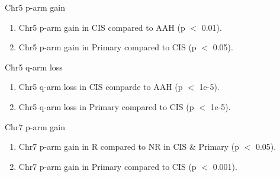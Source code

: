 \documentclass{beamer}
\begin{document}
\begin{frame}[allowframebreaks]
        \begin{block}{Chr5 p-arm gain}
            \begin{enumerate}
                \item Chr5 p-arm gain in CIS compared to AAH (p $<$ 0.01).
                \item Chr5 p-arm gain in Primary compared to CIS (p $<$ 0.05).
            \end{enumerate}

            \begin{table}
                \caption{CGC Tier1 genes in Chr5 p-arm}
                \resizebox{\linewidth}{!}
                {}
            \end{table}
        \end{block}

        \begin{block}{Chr5 q-arm loss}
            \begin{enumerate}
                \item Chr5 q-arm loss in CIS comparde to AAH (p $<$ 1e-5).
                \item Chr5 q-arm loss in Primary compared to CIS (p $<$ 1e-5).
            \end{enumerate}

            \begin{table}
                \caption{CGC Tier1 genes in Ch5 q-arm}
                \resizebox{\linewidth}{!}
                {}
            \end{table}
        \end{block}

        \begin{block}{Chr7 p-arm gain}
            \begin{enumerate}
                \item Chr7 p-arm gain in R compared to NR in CIS \& Primary (p $<$ 0.05).
                \item Chr7 p-arm gain in Primary compared to CIS (p $<$ 0.001).
            \end{enumerate}

            \begin{table}
                \caption{CGC Tier1 genes in Chr7 p-arm}
                \resizebox{\linewidth}{!}
                {}
            \end{table}
        \end{block}


\end{frame}
\end{document}
